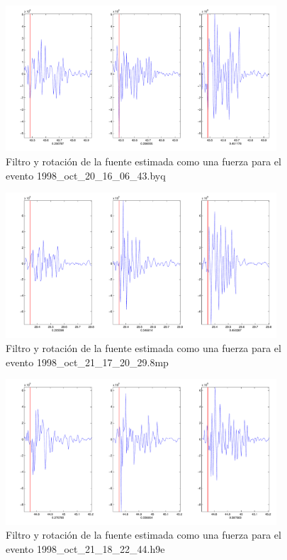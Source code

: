 \begin{figure}[H]
\includegraphics[width=0.9\textwidth,height=0.4\textheight]{linea_timerev/figuras/plotSrcEv19filtrotsrc.pdf}
\caption{Filtro y rotación de la fuente estimada como una fuerza para el
evento 1998\_oct\_20\_16\_06\_43.byq}
\end{figure}
\begin{figure}[H]
\includegraphics[width=0.9\textwidth,height=0.4\textheight]{linea_timerev/figuras/plotSrcEv20filtrotsrc.pdf}
\caption{Filtro y rotación de la fuente estimada como una fuerza para el
evento 1998\_oct\_21\_17\_20\_29.8mp}
\end{figure}
\begin{figure}[H]
\includegraphics[width=0.9\textwidth,height=0.4\textheight]{linea_timerev/figuras/plotSrcEv21filtrotsrc.pdf}
\caption{Filtro y rotación de la fuente estimada como una fuerza para el
evento 1998\_oct\_21\_18\_22\_44.h9e}
\end{figure}
